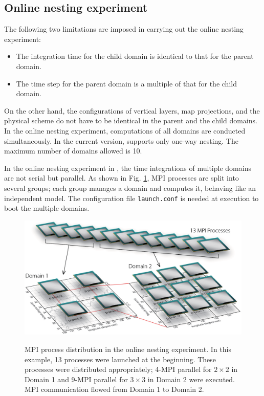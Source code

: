 \subsection{Online nesting experiment} \label{subsec:nest_online}

The following two limitations are imposed in carrying out the online nesting experiment:
\begin{itemize}
\item The integration time for the child domain is identical to that for the parent domain.
\item The time step for the parent domain is a multiple of that for the child domain.
\end{itemize}
On the other hand, the configurations of vertical layers, map projections, and the physical scheme do not have to be identical in the parent and the child domains. In the online nesting experiment, computations of all domains are conducted simultaneously. In the current version, \scalerm supports only one-way nesting. The maximum number of domains allowed is 10.

In the online nesting experiment in \scalerm, the time integrations of multiple domains are not serial but parallel. As shown in Fig. \ref{fig_mpisplit}, MPI processes are split into several groups; each group manages a domain and computes it, behaving like an independent model. The configuration file \verb|launch.conf| is needed at execution to boot the multiple domains.

\begin{figure}[tbh]
\begin{center}
  \includegraphics[width=0.8\hsize]{./figure/mpisplit_nesting.eps}\\
  \caption{ MPI process distribution in the online nesting experiment. In this example,   13 processes were launched at the beginning. These processes were distributed appropriately;     4-MPI parallel for $2 \times 2$ in Domain 1 and 9-MPI parallel for $3 \times 3$ in Domain 2 were executed.     MPI communication flowed from Domain 1 to Domain 2.
  }
  \label{fig_mpisplit}
\end{center}
\end{figure}

